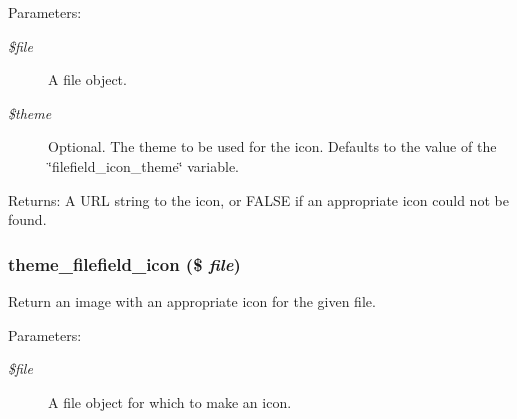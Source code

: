 \begin{Desc}
\item[Parameters:]
\begin{description}
\item[{\em \$file}]A file object. \item[{\em \$theme}]Optional. The theme to be used for the icon. Defaults to the value of the \char`\"{}filefield\_\-icon\_\-theme\char`\"{} variable. \end{description}
\end{Desc}
\begin{Desc}
\item[Returns:]A URL string to the icon, or FALSE if an appropriate icon could not be found. \end{Desc}
\hypertarget{filefield_8theme_8inc_6df3b5d0fbba2c291425ea6ebf9212bb}{
\subsubsection[{theme\_\-filefield\_\-icon}]{\setlength{\rightskip}{0pt plus 5cm}theme\_\-filefield\_\-icon (\$ {\em file})}}
\label{filefield_8theme_8inc_6df3b5d0fbba2c291425ea6ebf9212bb}


Return an image with an appropriate icon for the given file.

\begin{Desc}
\item[Parameters:]
\begin{description}
\item[{\em \$file}]A file object for which to make an icon. \end{description}
\end{Desc}
